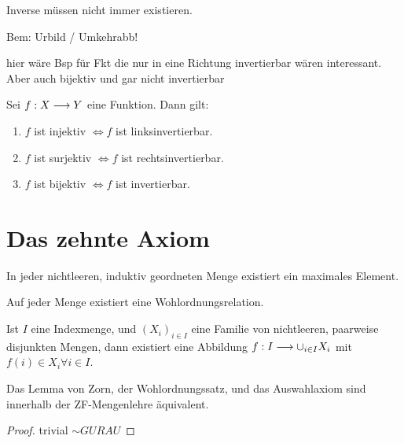 Inverse müssen nicht immer existieren.

Bem: Urbild / Umkehrabb!

\begin{example}
    hier wäre Bsp für Fkt die nur in eine Richtung invertierbar wären interessant. Aber auch bijektiv und gar nicht invertierbar
\end{example}

\begin{lemma}
    \label{lem-existence-inverse-function}
    Sei $f: X \longrightarrow Y$ eine Funktion. Dann gilt:
    \begin{enumerate}
        \item $f$ ist injektiv $\iff f$ ist linksinvertierbar.
        \item $f$ ist surjektiv $\iff f$ ist rechtsinvertierbar.
        \item $f$ ist bijektiv $\iff f$ ist invertierbar.
    \end{enumerate}
\end{lemma}

\section{Das zehnte Axiom}
\label{chapter-tenth-axiom}

\begin{axiom}
    \label{lemma-von-zorn}
    In jeder nichtleeren, induktiv geordneten Menge existiert ein maximales Element.
\end{axiom}

\begin{axiom}[Wohlordnungssatz]
    \label{wohlordnungssatz}
    Auf jeder Menge existiert eine Wohlordnungsrelation.
\end{axiom}

\begin{axiom}[Auswahlaxiom]
    \label{axiom-of-choice}
    Ist $I$ eine Indexmenge, und $(X_i)_{i \in I}$ eine Familie von nichtleeren, paarweise disjunkten Mengen, dann existiert eine Abbildung $f: I \longrightarrow \cup_{i \in I}X_i$ mit $f(i) \in X_i \forall i \in I$.
\end{axiom}

\begin{theorem}[C]
    Das Lemma von Zorn, der Wohlordnungssatz, und das Auswahlaxiom sind innerhalb der ZF-Mengenlehre äquivalent.
\end{theorem}
\begin{proof}
    trivial $\sim GURAU$
\end{proof}



